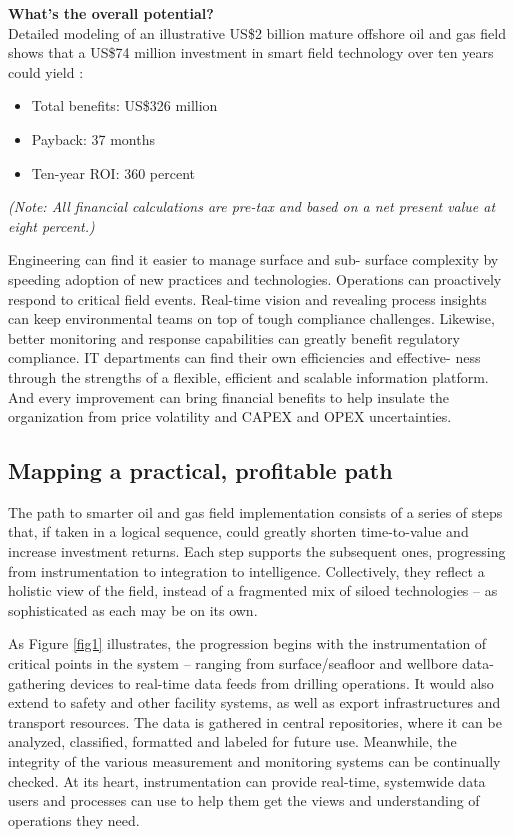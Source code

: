 \documentclass[twocolumn]{article}
\newcommand{\bi}{\begin{itemize}}
\newcommand{\ei}{\end{itemize}}
\newcommand{\ii}{\item}
\begin{document}
\noindent
\textbf{What\rq{}s the overall potential?}\\
Detailed modeling of an illustrative US\$2 billion mature offshore oil and gas field shows that a US\$74 million investment in smart field technology over ten years could yield \cite{IBMCAI:2011}:
\bi
\ii Total benefits: US\$326 million
\ii Payback: 37 months
\ii Ten-year ROI: 360 percent
\ei
\emph{(Note: All financial calculations are pre-tax and based on a net present value at eight percent.)}

Engineering can find it easier to manage surface and sub- surface complexity by speeding adoption of new practices
and technologies. Operations can proactively respond to critical field events. Real-time vision and revealing process insights can keep environmental teams on top of tough compliance challenges. Likewise, better monitoring and response capabilities can greatly benefit regulatory compliance. IT departments can find their own efficiencies and effective- ness through the strengths of a flexible, efficient and scalable information platform. And every improvement can bring financial benefits to help insulate the organization from price volatility and CAPEX and OPEX uncertainties.

\subsection{Mapping a practical, profitable path}
The path to smarter oil and gas field implementation consists of a series of steps that, if taken in a logical sequence, could greatly shorten time-to-value and increase investment returns. Each step supports the subsequent ones, progressing from instrumentation to integration to intelligence. Collectively, they reflect a holistic view of the field, instead of a fragmented mix of siloed technologies – as sophisticated as each may be on its own.

As Figure \ref{fig1} illustrates, the progression begins with the instrumentation of critical points in the system – ranging from surface/seafloor and wellbore data-gathering devices to real-time data feeds from drilling operations. It would also extend to safety and other facility systems, as well as export infrastructures and transport resources. The data is gathered in central repositories, where it can be analyzed, classified, formatted and labeled for future use. Meanwhile, the integrity of the various measurement and monitoring systems can be continually checked. At its heart, instrumentation can provide real-time, systemwide data users and processes can use to help them get the views and understanding of operations they need.
\end{document}
